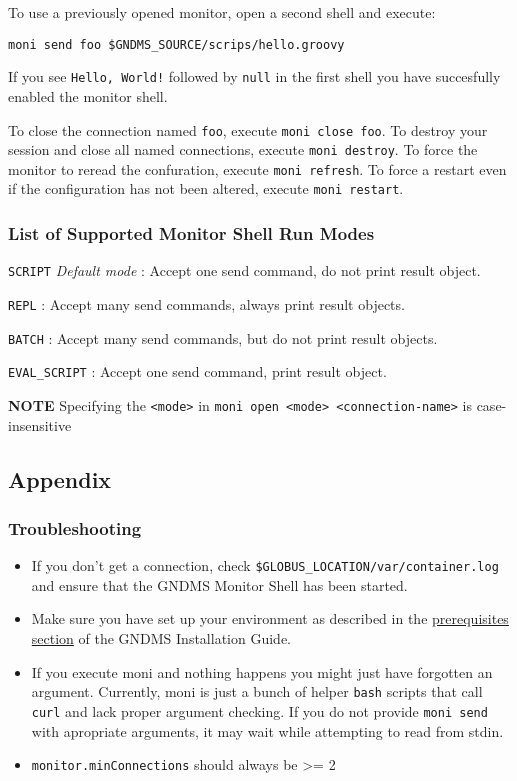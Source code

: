 \documentclass{article}
\begin{document}
To use a previously opened monitor, open a second shell and
execute:

\begin{verbatim}
moni send foo $GNDMS_SOURCE/scrips/hello.groovy
\end{verbatim}
If you see \verb"Hello, World!" followed by \verb!null! in the
first shell you have succesfully enabled the monitor shell.

To close the connection named \verb!foo!, execute
\verb!moni close foo!. To destroy your session and close all named
connections, execute \verb!moni destroy!. To force the monitor to
reread the confuration, execute \verb!moni refresh!. To force a
restart even if the configuration has not been altered, execute
\verb!moni restart!.

\subsubsection{List of Supported Monitor Shell Run Modes}

\verb!SCRIPT! \emph{Default mode} : Accept one send command, do not
print result object.

\verb!REPL! : Accept many send commands, always print result
objects.

\verb!BATCH! : Accept many send commands, but do not print result
objects.

\verb!EVAL_SCRIPT! : Accept one send command, print result object.

\textbf{NOTE} Specifying the \verb!<mode>! in
\verb!moni open <mode> <connection-name>! is case-insensitive

\subsection{Appendix}

\subsubsection{Troubleshooting}

\begin{itemize}
\item
  If you don't get a connection, check
  \verb!$GLOBUS_LOCATION/var/container.log! and ensure that the GNDMS
  Monitor Shell has been started.

\item
  Make sure you have set up your environment as described in the
  \href{/installation-guide/#prerequisites}{prerequisites section} of
  the GNDMS Installation Guide.

\item
  If you execute moni and nothing happens you might just have
  forgotten an argument. Currently, moni is just a bunch of helper
  \verb!bash! scripts that call \verb!curl! and lack proper argument
  checking. If you do not provide \verb!moni send! with apropriate
  arguments, it may wait while attempting to read from stdin.

\item
  \verb!monitor.minConnections! should always be \textgreater{}= 2

\end{itemize}
\end{document}
